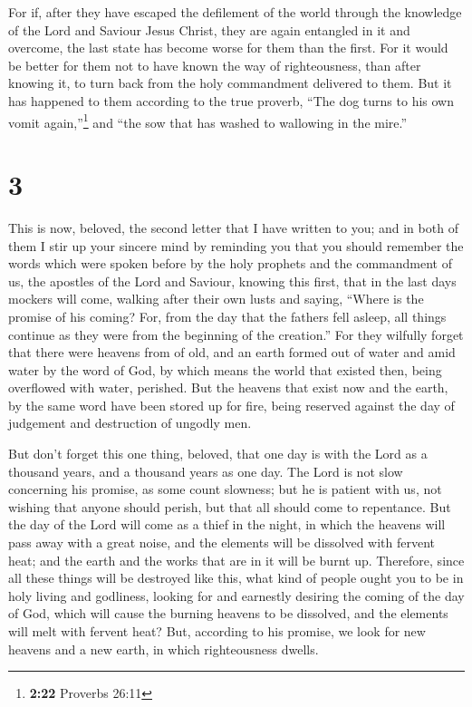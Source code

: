 For if, after they have escaped the defilement of the
world through the knowledge of the Lord and Saviour Jesus Christ, they
are again entangled in it and overcome, the last state has become worse
for them than the first.  For it would be better for them
not to have known the way of righteousness, than after knowing it, to
turn back from the holy commandment delivered to them. 
But it has happened to them according to the true proverb, ``The dog
turns to his own vomit again,''\footnote{\textbf{2:22} Proverbs 26:11}
and ``the sow that has washed to wallowing in the mire.''

\hypertarget{section-2}{%
\section{3}\label{section-2}}

 This is now, beloved, the second letter that I have
written to you; and in both of them I stir up your sincere mind by
reminding you  that you should remember the words which
were spoken before by the holy prophets and the commandment of us, the
apostles of the Lord and Saviour,  knowing this first,
that in the last days mockers will come, walking after their own lusts
 and saying, ``Where is the promise of his coming? For,
from the day that the fathers fell asleep, all things continue as they
were from the beginning of the creation.''  For they
wilfully forget that there were heavens from of old, and an earth formed
out of water and amid water by the word of God,  by which
means the world that existed then, being overflowed with water,
perished.  But the heavens that exist now and the earth,
by the same word have been stored up for fire, being reserved against
the day of judgement and destruction of ungodly men.

 But don't forget this one thing, beloved, that one day is
with the Lord as a thousand years, and a thousand years as one day.
 The Lord is not slow concerning his promise, as some
count slowness; but he is patient with us, not wishing that anyone
should perish, but that all should come to repentance. 
But the day of the Lord will come as a thief in the night, in which the
heavens will pass away with a great noise, and the elements will be
dissolved with fervent heat; and the earth and the works that are in it
will be burnt up.  Therefore, since all these things will
be destroyed like this, what kind of people ought you to be in holy
living and godliness,  looking for and earnestly desiring
the coming of the day of God, which will cause the burning heavens to be
dissolved, and the elements will melt with fervent heat? 
But, according to his promise, we look for new heavens and a new earth,
in which righteousness dwells.

